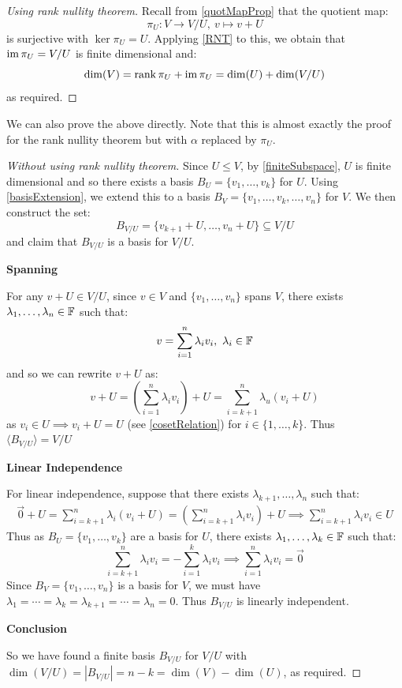 \documentclass[../main.tex]{subfiles}
\begin{document}
\begin{proof}[Using rank nullity theorem]
  Recall from \cref{quotMapProp} that the quotient map:
  \[
    \pi_U: V \to V / U,\ v \mapsto v + U
  \]
  is surjective with $\ker \pi_U = U$.
  Applying \cref{RNT} to this, we obtain that $\operatorname{im} \pi_{U} = V / U$ is finite dimensional and:
  \[
    \dim(V) = \operatorname{rank} \pi_U + \operatorname{im} \pi_U = \dim(U) + \dim(V / U)
  \]
  as required.
\end{proof}
We can also prove the above directly.
Note that this is almost exactly the proof for the rank nullity theorem but with $\alpha$ replaced by $\pi_U$.
\begin{proof}[Without using rank nullity theorem]
  Since $U \leq V$, by \cref{finiteSubspace}, $U$ is finite dimensional and so there exists a basis $B_U = \{v_1, \ldots, v_k\}$ for $U$.
  Using \cref{basisExtension}, we extend this to a basis $B_V = \{v_1, \ldots, v_k, \ldots, v_n\}$ for $V$.
  We then construct the set:
  \[
    B_{V / U} = \{v_{k + 1} + U, \ldots, v_n + U\} \subseteq V / U
  \]
  and claim that $B_{V / U}$ is a basis for $V / U$.

  \textbf{Spanning}\par
  For any $v + U \in V / U$, since $v \in V$ and $\{v_1, \ldots, v_n\}$ spans $V$, there exists $\lambda_1, \ldots, \lambda_n \in \mathbb{F}$ such that:
  \[
    v = \sum_{i = 1}^{n} \lambda_i v_i,\ \lambda_i \in \mathbb{F}
  \]
  and so we can rewrite $v + U$ as:
  \[
    v + U = \left(\sum_{i = 1}^{n} \lambda_i v_i\right) + U = \sum_{i = k + 1}^{n} \lambda_u (v_i + U)
  \]
  as $v_i \in U \implies v_i + U = U$ (see \cref{cosetRelation}) for $i \in \{1, \ldots, k\}$.
  Thus $\langle B_{V / U} \rangle = V / U$

  \textbf{Linear Independence}\par
  For linear independence, suppose that there exists $\lambda_{k + 1}, \ldots, \lambda_n$ such that:
  \begin{align*}
    \vec{0} + U = \sum_{i = k + 1}^{n} \lambda_i (v_i + U) = \left(\sum_{i = k + 1}^{n} \lambda_i v_i\right) + U \implies \sum_{i = k + 1}^{n} \lambda_i v_i \in U
  \end{align*}
  Thus as $B_U = \{v_1, \ldots, v_k\}$ are a basis for $U$, there exists $\lambda_1, \ldots, \lambda_k \in \mathbb{F}$ such that:
  \[
    \sum_{i = k + 1}^{n} \lambda_i v_i = - \sum_{i = 1}^{k} \lambda_i v_i \implies \sum_{i = 1}^{n} \lambda_i v_i = \vec{0}
  \]
  Since $B_V = \{v_1, \ldots, v_n\}$ is a basis for $V$, we must have $\lambda_1 = \cdots = \lambda_k = \lambda_{k + 1} = \cdots = \lambda_n = 0$.
  Thus $B_{V / U}$ is linearly independent.

  \textbf{Conclusion}\par
  So we have found a finite basis $B_{V / U}$ for $V / U$ with $\dim(V / U) = |B_{V / U}| = n - k = \dim(V) - \dim(U)$, as required.
\end{proof}
\end{document}
